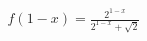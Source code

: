 \documentclass[preview]{standalone}
\begin{document}
\begin{align*}
f(1-x) = \frac{2^{1-x}}{2^{1-x} + \sqrt{2}}
\end{align*}
\end{document}
